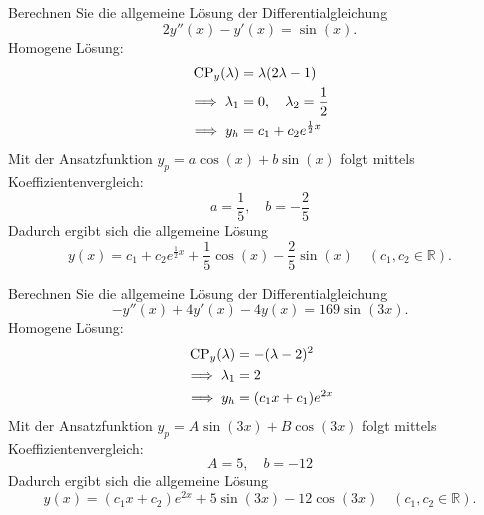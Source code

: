 \documentclass[parskip=full]{scrartcl}
\begin{document}
Berechnen Sie die allgemeine Lösung der Differentialgleichung
\begin{displaymath}
  2y''(x) - y'(x) = \sin(x).
\end{displaymath}
Homogene Lösung:
\begin{align*}
  \operatorname{CP}_y(\lambda) &= \lambda(2\lambda - 1)\\
  \implies \lambda_1 &= 0, \quad \lambda_2 = \frac{1}{2}\\
  \implies y_h &= c_1 + c_2 e^{\frac{1}{2} x}
\end{align*}
Mit der Ansatzfunktion $y_p = a \cos(x) + b\sin(x)$ folgt mittels Koeffizientenvergleich:
\begin{displaymath}
  a = \frac{1}{5}, \quad b = -\frac{2}{5}
\end{displaymath}
Dadurch ergibt sich die allgemeine Lösung
\begin{displaymath}
  y(x) = c_1 + c_2 e^{\frac{1}{2} x} + \frac{1}{5}\cos(x) - \frac{2}{5}\sin(x) \quad (c_1, c_2 \in \mathbb{R}).
\end{displaymath}

Berechnen Sie die allgemeine Lösung der Differentialgleichung
\begin{displaymath}
  -y''(x) + 4y'(x) - 4y(x) = 169 \sin(3x). 
\end{displaymath}
Homogene Lösung:
\begin{align*}
  \operatorname{CP}_y(\lambda) &= -(\lambda - 2)^2\\
  \implies \lambda_1 &= 2\\
  \implies y_h &= (c_1 x + c_1)e^{2x}
\end{align*}
Mit der Ansatzfunktion $y_p = A\sin(3x) + B\cos(3x)$ folgt mittels Koeffizientenvergleich:
\begin{displaymath}
  A = 5, \quad b = -12
\end{displaymath}
Dadurch ergibt sich die allgemeine Lösung
\begin{displaymath}
  y(x) = (c_1 x + c_2)e^{2x} + 5\sin(3x) - 12\cos(3x) \quad (c_1, c_2 \in \mathbb{R}).
\end{displaymath}
\end{document}
